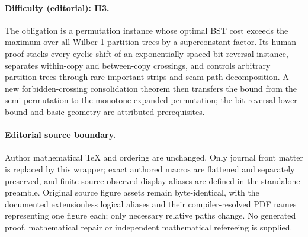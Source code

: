 \documentclass[11pt]{article}
\numberwithin{equation}{section}
\theoremstyle{definition}
\theoremstyle{plain}
\begin{document}
\paragraph{Difficulty (editorial): H3.}
The obligation is a permutation instance whose optimal BST cost exceeds the maximum over all Wilber-1 partition trees by a superconstant factor. Its human proof stacks every cyclic shift of an exponentially spaced bit-reversal instance, separates within-copy and between-copy crossings, and controls arbitrary partition trees through rare important strips and seam-path decomposition. A new forbidden-crossing consolidation theorem then transfers the bound from the semi-permutation to the monotone-expanded permutation; the bit-reversal lower bound and basic geometry are attributed prerequisites.
\paragraph{Editorial source boundary.}
Author mathematical TeX and ordering are unchanged. Only journal front matter is replaced by this wrapper; exact authored macros are flattened and separately preserved, and finite source-observed display aliases are defined in the standalone preamble. Original source figure assets remain byte-identical, with the documented extensionless logical aliases and their compiler-resolved PDF names representing one figure each; only necessary relative paths change. No generated proof, mathematical repair or independent mathematical refereeing is supplied. 
\clearpage

%
%
%

%

%
%
%
%
%

\newtheorem{observation}[]{Observation}

%
%
%
%
%

\newcommand{\MS}{{\sf Machine Scheduling}\xspace}
\newcommand{\RMS}{{\sf Restricted Machine Scheduling}\xspace}
\newcommand{\CM}{{\sf Congestion Minimization}\xspace}
\newcommand{\ST}{{\sf Steiner Tree}\xspace}
\newcommand{\CD}{{\sf Cost-Distance}\xspace}
\newcommand{\PST}{{\sf Priority Steiner Tree}\xspace}
\newcommand{\FCNF}{{\sf FCNF}\xspace}
\newcommand{\AC}{{\sf Asymmetric $k$-Center}\xspace}
\newcommand{\kC}{{\sf $k$-Center}\xspace}
\newcommand{\dH}{{\sf $d$-Hypergraph-Cover}\xspace}
\newcommand{\kH}{{\sf $k$-Hypergraph-Cover}\xspace}
\newcommand{\GS}{{\sf Group-Steiner-Tree}\xspace}
\newcommand{\SC}{{\sf Set-Cover}\xspace}
\newcommand{\GAPSAT}{{\sf Gap-3SAT(5)}\xspace}
\newcommand{\clique}{{\sf Max-Clique}\xspace}
\newcommand{\ML}{{\sf Metric Labeling}\xspace}
\newcommand{\ZE}{{\sf 0-extension}\xspace}
\newcommand{\ZIE}{{\sf $(0,\infty)$-extension}\xspace}
\newcommand{\sat}{{\sf SAT}\xspace}
\newcommand{\mdc}{{\sf MDC}\xspace}
\newcommand{\csp}{{\sf HA-CSP}\xspace}
\newcommand{\lw}{{\sf left}\xspace}
\newcommand{\rw}{{\sf right}\xspace}
\newcommand{\yi}{{\sc Yes-Instance}\xspace}
\renewcommand{\ni}{{\sc No-Instance}\xspace}
\end{document}
